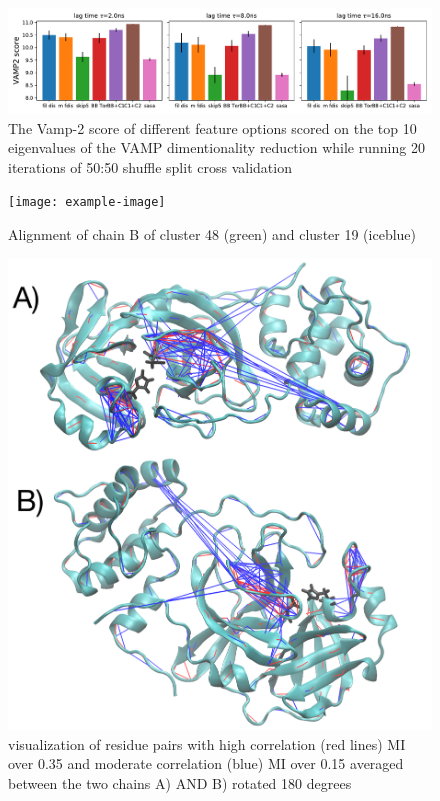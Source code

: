 \documentclass{biophys-new}
\begin{document}
\begin{figure}[hbt!]
\centering
\graphicspath{ {./supplemental_figures/} }
\includegraphics[width=0.6\linewidth]{sup_fig_2vamp_score_10dim_20splits_both_3_zoom.pdf}
\caption{The Vamp-2 score of different feature options scored on the top 10 eigenvalues of the VAMP dimentionality reduction while running 20 iterations of 50:50 shuffle split cross validation}
\label{fig:view}
\end{figure}

\begin{figure}  %
\centering
\graphicspath{ {./supplemental_figures/} }
\texttt{[image: example-image]}
\caption{Alignment of chain B of cluster 48 (green) and cluster 19 (iceblue)}
\label{fig:view}
\end{figure}

\begin{figure}[hbt!]
\graphicspath{ {./supplemental_figures/} }
\centering
\includegraphics[width=0.6\linewidth]{Averaged_MI_image.pdf}
\caption{visualization of residue pairs with high correlation (red lines) MI over 0.35 and moderate correlation (blue) MI over 0.15 averaged between the two chains A) AND B) rotated 180 degrees}
\label{fig:view}
\end{figure}
\end{document}
